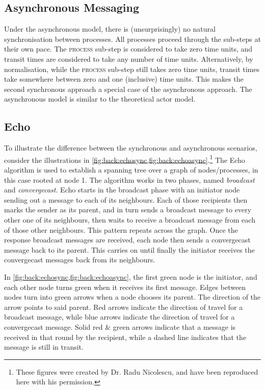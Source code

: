 \subsection{Asynchronous Messaging}
Under the asynchronous model, there is (unsurprisingly) no natural synchronisation between processes.  All processes proceed through the sub-steps at their own pace.  The \textsc{process} sub-step is considered to take zero time units, and transit times are considered to take any number of time units.  Alternatively, by normalisation, while the \textsc{process} sub-step still takes zero time units, transit times take somewhere between zero and one (inclusive) time units.  This makes the second synchronous approach a special case of the asynchronous approach.  The asynchronous model is similar to the theoretical \gls{actor} model.

\subsection{Echo}
To illustrate the difference between the synchronous and asynchronous scenarios, consider the illustrations in \cref{fig:back:echosync,fig:back:echoasync}.\footnote{These figures were created by Dr. Radu Nicolescu, and have been reproduced here with his permission.}  The Echo algorithm \cite[Ch.~4.3]{Fokkink2013} is used to establish a spanning tree over a graph of nodes/processes, in this case rooted at node 1.  The algorithm works in two phases, named \emph{broadcast} and \emph{convergecast}.  Echo starts in the broadcast phase with an initiator node sending out a message to each of its neighbours.  Each of those recipients then marks the sender as its parent, and in turn sends a broadcast message to every other one of its neighbours, then waits to receive a broadcast message from each of those other neighbours.  This pattern repeats across the graph.  Once the response broadcast messages are received, each node then sends a convergecast message back to its parent.  This carries on until finally the initiator receives the convergecast messages back from its neighbours.

In \cref{fig:back:echosync,fig:back:echoasync}, the first green node is the initiator, and each other node turns green when it receives its first message.  Edges between nodes turn into green arrows when a node chooses its parent.  The direction of the arrow points to said parent.  Red arrows indicate the direction of travel for a broadcast message, while blue arrows indicate the direction of travel for a convergecast message.  Solid red \& green arrows indicate that a message is received in that round by the recipient, while a dashed line indicates that the message is still in transit.

